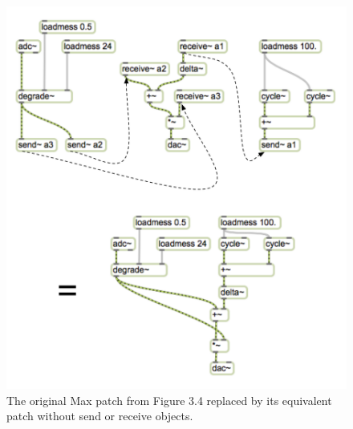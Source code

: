 \documentclass[a4paper,12pt]{report} 	%
\numberwithin{figure}{chapter}
\numberwithin{table}{chapter}
\numberwithin{equation}{chapter}
\begin{document}
\begin{flushleft}
\begin{figure}[h!]
\begin{center}
\includegraphics[scale=0.75]{MaxDAGsSendReceive1}
\caption[Removing send\texttildelow{} and receive\texttildelow{} Objects]{The original Max patch from Figure 3.4 replaced by its equivalent patch without send\texttildelow{} or receive\texttildelow{} objects.}
\end{center}
\end{figure}
\begin{figure}[h!]
\begin{center}

\end{center}
\end{figure}
\end{flushleft}
\end{document}
